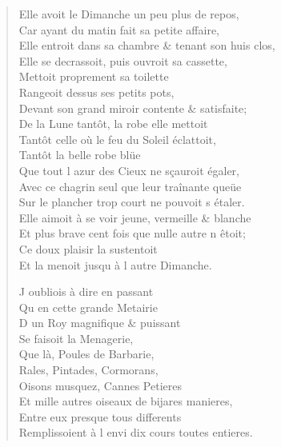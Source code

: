 \begin{verse}
Elle avoit le Dimanche un peu plus de repos, \\
Car ayant du matin fait sa petite affaire, \\
Elle entroit dans sa chambre \& tenant son huis clos, \\
Elle se decrassoit, puis ouvroit sa cassette, \\
\vin Mettoit proprement sa toilette \\
\vin Rangeoit dessus ses petits pots, \\
Devant son grand miroir contente \& satisfaite; \\
De la Lune tantôt, la robe elle mettoit \\
Tantôt celle où le feu du Soleil éclattoit, \\
\vin Tantôt la belle robe blüe \\
Que tout l\textquotesingle{} azur des Cieux ne sçauroit égaler, \\
Avec ce chagrin seul que leur traînante queüe \\
Sur le plancher trop court ne pouvoit s\textquotesingle{} étaler. \\
Elle aimoit à se voir jeune, vermeille \& blanche \\
Et plus brave cent fois que nulle autre n\textquotesingle{} êtoit; \\
\vin Ce doux plaisir la sustentoit \\
\vin Et la menoit jusqu\textquotesingle{} à l\textquotesingle{} autre Dimanche.

\vin J\textquotesingle{} oubliois à dire en passant \\
\vin Qu\textquotesingle{} en cette grande Metairie \\
\vin D\textquotesingle{} un Roy magnifique \& puissant \\
\vin Se faisoit la Menagerie, \\
\vin Que là, Poules de Barbarie, \\
\vin Rales, Pintades, Cormorans, \\
\vin Oisons musquez, Cannes Petieres \\
Et mille autres oiseaux de bijares manieres, \\
\vin Entre eux presque tous differents \\
Remplissoient à l\textquotesingle{} envi dix cours toutes entieres.


\end{verse}
